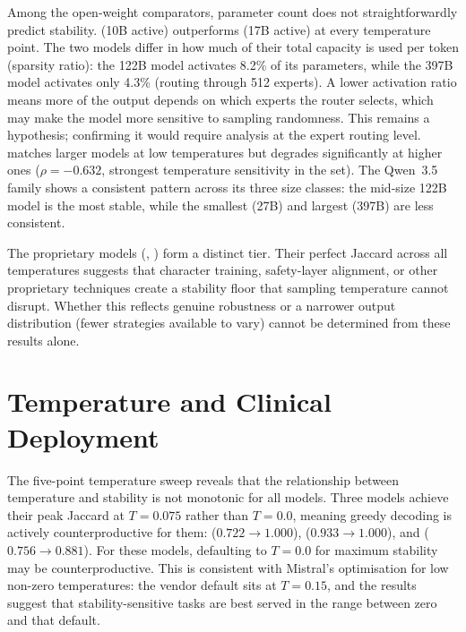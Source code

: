 Among the open-weight comparators, parameter count does not straightforwardly
predict stability.  (10B active) outperforms
 (17B active) at every temperature point. The
two models differ in how much of their total capacity is used per token (sparsity ratio):
the 122B model activates 8.2\% of its parameters, while the 397B model
activates only 4.3\% (routing through 512 experts). A lower activation
ratio means more of the output depends on which experts the router
selects, which may make the model more sensitive to sampling randomness.
This remains a hypothesis; confirming it would require analysis at the
expert routing level.
 matches larger models at low temperatures but
degrades significantly at higher ones ($\rho = -0.632$, strongest
temperature sensitivity in the set). The Qwen~3.5 family shows a
consistent pattern across its three size classes: the mid-size 122B model
is the most stable, while the smallest (27B) and largest (397B) are less
consistent.

The proprietary models (, )
form a distinct tier. Their perfect Jaccard across all temperatures
suggests that character training, safety-layer alignment, or other
proprietary techniques create a stability floor that sampling temperature
cannot disrupt. Whether this reflects genuine robustness or a narrower
output distribution (fewer strategies available to vary) cannot be
determined from these results alone.


\section{Temperature and Clinical Deployment}
\label{sec:disc-temperature}

The five-point temperature sweep reveals that the relationship between
temperature and stability is not monotonic for all models. Three models
achieve their peak Jaccard at $T = 0.075$ rather than $T = 0.0$, meaning
greedy decoding is actively counterproductive for them:  ($0.722 \to 1.000$),
 ($0.933 \to 1.000$), and
 ($0.756 \to 0.881$). For these models, defaulting to $T = 0.0$ for maximum stability may be
counterproductive. This is consistent with Mistral's optimisation for low
non-zero temperatures: the vendor default sits at $T = 0.15$, and the
results suggest that stability-sensitive tasks are best served in the
range between zero and that default.

